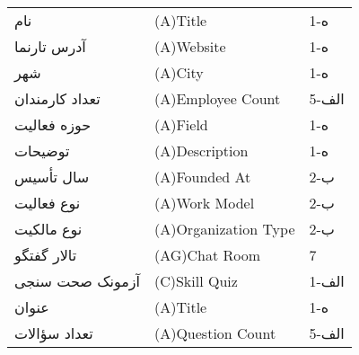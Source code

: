 \documentclass[12pt]{article}
\begin{document}
\begin{table}[]
\begin{tabular}{lll}
			نام                                  & (A)Title                                                                                                      & 1-ه   \\
			آدرس تارنما                          & (A)Website                                                                                                    & 1-ه   \\
			شهر                                  & (A)City                                                                                                       & 1-ه   \\
			تعداد کارمندان                       & (A)Employee Count                                                                                             & 5-الف \\
			حوزه فعالیت                          & (A)Field                                                                                                      & 1-ه   \\
			توضیحات                              & (A)Description                                                                                                & 1-ه   \\
			سال تأسیس                            & (A)Founded At                                                                                                 & 2-ب   \\
			نوع فعالیت                           & (A)Work Model                                                                                                 & 2-ب   \\
			نوع مالکیت                           & (A)Organization Type                                                                                          & 2-ب   \\
			تالار گفتگو                          & (AG)Chat Room                                                                                                 & 7     \\
			آزمونک صحت سنجی                      & (C)Skill Quiz                                                                                                 & 1-الف \\
			عنوان                                & (A)Title                                                                                                      & 1-ه   \\
			تعداد سؤالات                         & (A)Question Count                                                                                             & 5-الف \\

\end{tabular}
\end{table}
\end{document}
